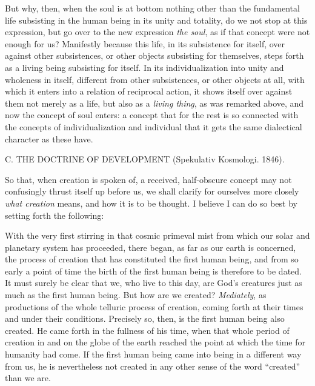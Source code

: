 \documentclass[12pt,a4paper,openany]{book}
\newcommand{\opage}[1]{\marginnote{\footnotesize\textit{[#1]}}}
\newcommand{\excerpthead}[1]{\par\bigskip\begin{center}#1\end{center}\nopagebreak\smallskip}
\begin{document}
But why, then, when the soul is at bottom nothing other than the fundamental life
subsisting in the human being in its unity and totality, do we not stop at this
expression, but go over to the new expression \emph{the soul}, as if that concept
were not enough for us? Manifestly because this life, in its subsistence for itself,
over against other subsistences, or other objects subsisting for themselves, steps
forth as a living being subsisting for itself. In its individualization into unity
and wholeness in itself, different from other subsistences, or other objects at all,
with which it enters into a relation of reciprocal action, it shows itself over
against them not merely as a life, but also as a \emph{living thing}, as was remarked
above, and now the concept of soul enters: a concept that for the rest is so
connected with the concepts of individualization and individual that it gets the same
dialectical character as these have.

\setcounter{footnote}{0}%
\excerpthead{C. THE DOCTRINE OF DEVELOPMENT (Spekulativ Kosmologi. 1846).}\opage{126}

So that, when creation is spoken of, a received, half-obscure concept may not
confusingly thrust itself up before us, we shall clarify for ourselves more closely
\emph{what creation} means, and how it is to be thought. I believe I can do so best
by setting forth the following:

With the very first stirring in that cosmic primeval mist from which our solar and
planetary system has proceeded, there began, as far as our earth is concerned, the
process of creation that has constituted the first human being, and from so early a
point of time the birth of the first human being is therefore to be dated. It must
surely be clear that we, who live to this day, are God's creatures just as much as
the first human being. But how are we created? \emph{Mediately}, as productions of
the whole telluric process of creation, coming forth at their times and under their
conditions. Precisely so, then, is the first human being also created. He came forth
in the fullness of his time, when that whole period of creation in and on the globe
of the earth reached the point at which the time for humanity had come. If the first
human being came into being in a different way from us, he is nevertheless not
created in any other sense of the word ``created'' than we are.
\end{document}

